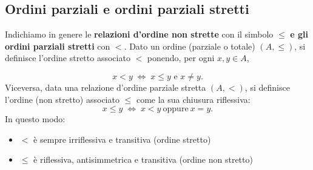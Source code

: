 













\subsection{Ordini parziali e ordini parziali stretti}
Indichiamo in genere le \textbf{relazioni d'ordine non strette} con il simbolo \(\le\) \textbf{e gli ordini parziali stretti} con \(<\).
Dato un ordine (parziale o totale) \((A,\le)\), si definisce l'ordine stretto associato \(<\) ponendo, per ogni \(x,y\in A\),

\[
x<y \;\iff\; x\le y \text{ e } x\ne y .
\]
Viceversa, data una relazione d'ordine parziale stretta \((A,<)\), si definisce l'ordine (non stretto) associato \(\le\) come la sua chiusura riflessiva:
\[
x\le y \;\iff\; x<y \ \text{oppure}\ x=y .
\]
In questo modo:
\begin{itemize}
    \item \(<\)  è sempre irriflessiva e transitiva (ordine stretto)
    \item \(\le\) è riflessiva, antisimmetrica e transitiva (ordine non stretto)

\end{itemize}


